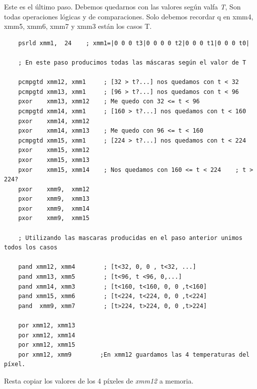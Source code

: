 Este es el último paso. Debemos quedarnos con las valores según valfa \emph{T}, Son todas operaciones lógicas y de comparaciones. Solo debemos recordar q en xmm4, xmm5, xmm6, xmm7 y xmm3 están los casos T.

\begin{codesnippet}
\begin{verbatim}				
    psrld xmm1,  24    ; xmm1=|0 0 0 t3|0 0 0 0 t2|0 0 0 t1|0 0 0 t0|

    ; En este paso producimos todas las máscaras según el valor de T

    pcmpgtd xmm12, xmm1     ; [32 > t?...] nos quedamos con t < 32
    pcmpgtd xmm13, xmm1     ; [96 > t?...] nos quedamos con t < 96
    pxor    xmm13, xmm12    ; Me quedo con 32 <= t < 96
    pcmpgtd xmm14, xmm1     ; [160 > t?...] nos quedamos con t < 160
    pxor    xmm14, xmm12
    pxor    xmm14, xmm13    ; Me quedo con 96 <= t < 160
    pcmpgtd xmm15, xmm1     ; [224 > t?...] nos quedamos con t < 224
    pxor    xmm15, xmm12
    pxor    xmm15, xmm13
    pxor    xmm15, xmm14    ; Nos quedamos con 160 <= t < 224    ; t > 224?
    pxor    xmm9,  xmm12
    pxor    xmm9,  xmm13
    pxor    xmm9,  xmm14
    pxor    xmm9,  xmm15

    ; Utilizando las mascaras producidas en el paso anterior unimos todos los casos
    
    pand xmm12, xmm4        ; [t<32, 0, 0 , t<32, ...]
    pand xmm13, xmm5        ; [t<96, t <96, 0,...]
    pand xmm14, xmm3        ; [t<160, t<160, 0, 0 ,t<160]
    pand xmm15, xmm6        ; [t<224, t<224, 0, 0 ,t<224]
    pand  xmm9, xmm7        ; [t>224, t>224, 0, 0 ,t>224]
													
    por xmm12, xmm13
    por xmm12, xmm14
    por xmm12, xmm15
    por xmm12, xmm9        ;En xmm12 guardamos las 4 temperaturas del píxel.
\end{verbatim}
\end{codesnippet}

Resta copiar los valores de los 4 píxeles de \emph{xmm12} a memoria.